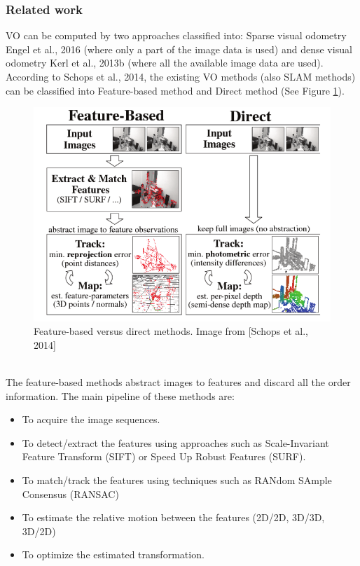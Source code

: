 \documentclass[11pt,openany]{book}
\begin{document}
\subsubsection{Related work}
VO can be computed by two approaches classified into: Sparse visual odometry Engel et al., 2016  (where only a part of the image data is used) and dense visual odometry Kerl et al., 2013b (where all the available image data are used). According to Schops et al., 2014, the existing VO methods (also SLAM methods) can be classified into Feature-based method and Direct method (See Figure \ref{fig:2.3}).
\begin{figure}[h]
    \centering
    \includegraphics[width=\linewidth]{assets/2_3.png}
    \caption{Feature-based versus direct methods. Image from [Schops et al., 2014]}
    \label{fig:2.3}
\end{figure}\\
The feature-based methods abstract images to features and discard all the order information. The main pipeline of these methods are:
\begin{itemize}
    \item To acquire the image sequences.
    \item To detect/extract the features using approaches such as Scale-Invariant Feature Transform (SIFT) or Speed Up Robust Features (SURF).
    \item To match/track the features using techniques such as RANdom SAmple Consensus (RANSAC)
    \item To estimate the relative motion between the features (2D/2D, 3D/3D, 3D/2D)
    \item To optimize the estimated transformation.
\end{itemize}
\end{document}
